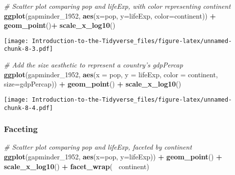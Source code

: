 \documentclass[
]{article}
\newenvironment{Shaded}{\begin{snugshade}}{\end{snugshade}}
\newcommand{\CommentTok}[1]{\textcolor[rgb]{0.56,0.35,0.01}{\textit{#1}}}
\newcommand{\DataTypeTok}[1]{\textcolor[rgb]{0.13,0.29,0.53}{#1}}
\newcommand{\DecValTok}[1]{\textcolor[rgb]{0.00,0.00,0.81}{#1}}
\newcommand{\KeywordTok}[1]{\textcolor[rgb]{0.13,0.29,0.53}{\textbf{#1}}}
\newcommand{\NormalTok}[1]{#1}
\newcommand{\OperatorTok}[1]{\textcolor[rgb]{0.81,0.36,0.00}{\textbf{#1}}}
\newcommand{\StringTok}[1]{\textcolor[rgb]{0.31,0.60,0.02}{#1}}
\begin{document}
\begin{Shaded}
\begin{Highlighting}[]
\CommentTok{# Scatter plot comparing pop and lifeExp, with color representing continent}
\KeywordTok{ggplot}\NormalTok{(gapminder_}\DecValTok{1952}\NormalTok{, }\KeywordTok{aes}\NormalTok{(}\DataTypeTok{x=}\NormalTok{pop, }\DataTypeTok{y=}\NormalTok{lifeExp, }\DataTypeTok{color=}\NormalTok{continent)) }\OperatorTok{+}
\StringTok{ }\KeywordTok{geom_point}\NormalTok{()}\OperatorTok{+}
\StringTok{ }\KeywordTok{scale_x_log10}\NormalTok{()}
\end{Highlighting}
\end{Shaded}

\texttt{[image: Introduction-to-the-Tidyverse\_files/figure-latex/unnamed-chunk-8-3.pdf]}

\begin{Shaded}
\begin{Highlighting}[]
\CommentTok{# Add the size aesthetic to represent a country's gdpPercap}
\KeywordTok{ggplot}\NormalTok{(gapminder_}\DecValTok{1952}\NormalTok{, }\KeywordTok{aes}\NormalTok{(}\DataTypeTok{x =}\NormalTok{ pop, }\DataTypeTok{y =}\NormalTok{ lifeExp, }\DataTypeTok{color =}\NormalTok{ continent, }\DataTypeTok{size=}\NormalTok{gdpPercap)) }\OperatorTok{+}
\StringTok{  }\KeywordTok{geom_point}\NormalTok{() }\OperatorTok{+}
\StringTok{  }\KeywordTok{scale_x_log10}\NormalTok{()}
\end{Highlighting}
\end{Shaded}

\texttt{[image: Introduction-to-the-Tidyverse\_files/figure-latex/unnamed-chunk-8-4.pdf]}

\hypertarget{faceting}{%
\subsubsection{Faceting}\label{faceting}}

\begin{Shaded}
\begin{Highlighting}[]
\CommentTok{# Scatter plot comparing pop and lifeExp, faceted by continent}
\KeywordTok{ggplot}\NormalTok{(gapminder_}\DecValTok{1952}\NormalTok{, }\KeywordTok{aes}\NormalTok{(}\DataTypeTok{x=}\NormalTok{pop, }\DataTypeTok{y=}\NormalTok{lifeExp)) }\OperatorTok{+}
\StringTok{ }\KeywordTok{geom_point}\NormalTok{() }\OperatorTok{+}
\StringTok{ }\KeywordTok{scale_x_log10}\NormalTok{() }\OperatorTok{+}
\StringTok{ }\KeywordTok{facet_wrap}\NormalTok{(}\OperatorTok{~}\StringTok{ }\NormalTok{continent)}
\end{Highlighting}
\end{Shaded}
\end{document}
